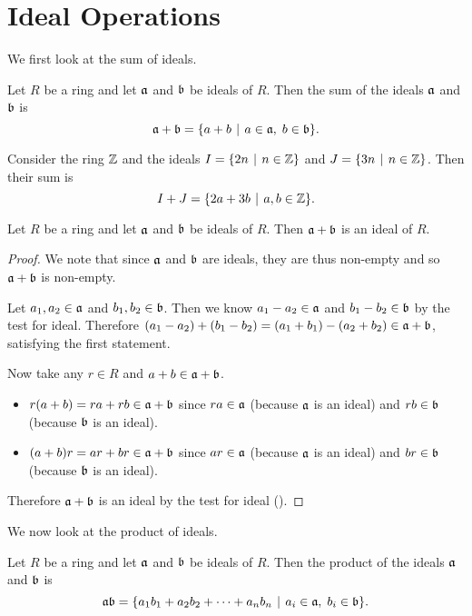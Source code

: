 \section{Ideal Operations}
We first look at the sum of ideals.
\begin{definition}
    Let $R$ be a ring and let $\mathfrak{a}$ and $\mathfrak{b}$ be ideals of $R$. Then the sum of the ideals $\mathfrak{a}$ and $\mathfrak{b}$ is
    \[
        \ideal{a} + \ideal{b} = \{a + b \vert a\in\ideal{a},\;b\in\ideal{b}\}.
    \]
\end{definition}
\begin{example}
    Consider the ring $\mathbb{Z}$ and the ideals $I = \{2n \vert n \in \Z\}$ and $J = \{3n \vert n \in \Z\}$. Then their sum is
    \[
        I + J = \{2a + 3b \vert a,b \in \Z\}.
    \]
\end{example}
\begin{proposition}\label{prop-sum-of-ideals-is-ideal}
    Let $R$ be a ring and let $\mathfrak{a}$ and $\mathfrak{b}$ be ideals of $R$. Then $\mathfrak{a} + \mathfrak{b}$ is an ideal of $R$.
\end{proposition}
\begin{proof}
    We note that since $\mathfrak{a}$ and $\mathfrak{b}$ are ideals, they are thus non-empty and so $\mathfrak{a}+\mathfrak{b}$ is non-empty.

    Let $a_1, a_2 \in \mathfrak{a}$ and $b_1, b_2 \in \mathfrak{b}$. Then we know $a_1 - a_2 \in \mathfrak{a}$ and $b_1 - b_2 \in \mathfrak{b}$ by the test for ideal. Therefore $(a_1 - a_2) + (b_1 - b_2) = (a_1 + b_1) - (a_2 + b_2) \in \mathfrak{a} + \mathfrak{b}$, satisfying the first statement.

    Now take any $r \in R$ and $a+b \in \mathfrak{a}+\mathfrak{b}$.
    \begin{itemize}
        \item $r(a+b) = ra + rb \in \mathfrak{a}+\mathfrak{b}$ since $ra \in \mathfrak{a}$ (because $\mathfrak{a}$ is an ideal) and $rb \in \mathfrak{b}$ (because $\mathfrak{b}$ is an ideal).
        \item $(a+b)r = ar + br \in \mathfrak{a}+\mathfrak{b}$ since $ar \in \mathfrak{a}$ (because $\mathfrak{a}$ is an ideal) and $br \in \mathfrak{b}$ (because $\mathfrak{b}$ is an ideal).
    \end{itemize}
    Therefore $\mathfrak{a} + \mathfrak{b}$ is an ideal by the test for ideal ().
\end{proof}

We now look at the product of ideals.
\begin{definition}
    Let $R$ be a ring and let $\mathfrak{a}$ and $\mathfrak{b}$ be ideals of $R$. Then the product of the ideals $\mathfrak{a}$ and $\mathfrak{b}$ is
    \[
        \ideal{ab} = \{a_1b_1 + a_2b_2 + \cdots + a_nb_n \vert a_i\in\ideal{a},\;b_i\in\ideal{b}\}.
    \]
\end{definition}


